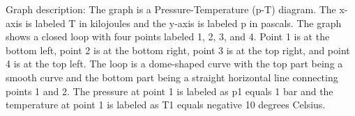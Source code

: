 Graph description: The graph is a Pressure-Temperature (p-T) diagram. The x-axis is labeled T in kilojoules and the y-axis is labeled p in pascals. The graph shows a closed loop with four points labeled 1, 2, 3, and 4. Point 1 is at the bottom left, point 2 is at the bottom right, point 3 is at the top right, and point 4 is at the top left. The loop is a dome-shaped curve with the top part being a smooth curve and the bottom part being a straight horizontal line connecting points 1 and 2. The pressure at point 1 is labeled as p1 equals 1 bar and the temperature at point 1 is labeled as T1 equals negative 10 degrees Celsius.